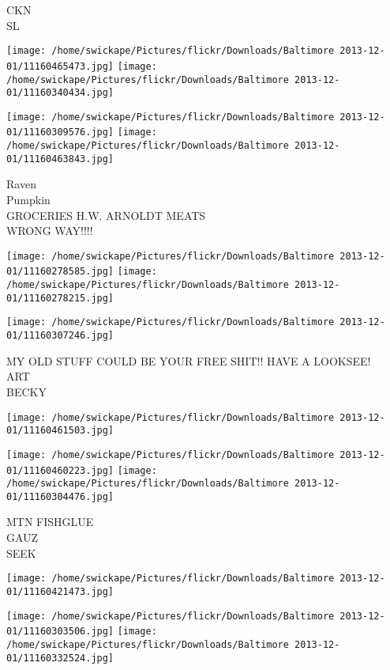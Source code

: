 \documentclass[10pt,letterpaper]{article}
\begin{document}
CKN\\
SL
\pagebreak

\texttt{[image: /home/swickape/Pictures/flickr/Downloads/Baltimore 2013-12-01/11160465473.jpg]}
\texttt{[image: /home/swickape/Pictures/flickr/Downloads/Baltimore 2013-12-01/11160340434.jpg]}

\texttt{[image: /home/swickape/Pictures/flickr/Downloads/Baltimore 2013-12-01/11160309576.jpg]}
\texttt{[image: /home/swickape/Pictures/flickr/Downloads/Baltimore 2013-12-01/11160463843.jpg]}

Raven\\
Pumpkin\\
GROCERIES H.W. ARNOLDT MEATS\\
WRONG WAY!!!!
\pagebreak

\texttt{[image: /home/swickape/Pictures/flickr/Downloads/Baltimore 2013-12-01/11160278585.jpg]}
\texttt{[image: /home/swickape/Pictures/flickr/Downloads/Baltimore 2013-12-01/11160278215.jpg]}

\vspace{0.25in}
\texttt{[image: /home/swickape/Pictures/flickr/Downloads/Baltimore 2013-12-01/11160307246.jpg]}

MY OLD STUFF COULD BE YOUR FREE SHIT!! HAVE A LOOKSEE!\\
ART\\
BECKY
\pagebreak

\texttt{[image: /home/swickape/Pictures/flickr/Downloads/Baltimore 2013-12-01/11160461503.jpg]}

\vspace{0.25in}
\texttt{[image: /home/swickape/Pictures/flickr/Downloads/Baltimore 2013-12-01/11160460223.jpg]}
\texttt{[image: /home/swickape/Pictures/flickr/Downloads/Baltimore 2013-12-01/11160304476.jpg]}

MTN FISHGLUE\\
GAUZ\\
SEEK
\pagebreak

\texttt{[image: /home/swickape/Pictures/flickr/Downloads/Baltimore 2013-12-01/11160421473.jpg]}

\vspace{0.25in}
\texttt{[image: /home/swickape/Pictures/flickr/Downloads/Baltimore 2013-12-01/11160303506.jpg]}
\texttt{[image: /home/swickape/Pictures/flickr/Downloads/Baltimore 2013-12-01/11160332524.jpg]}
\end{document}
